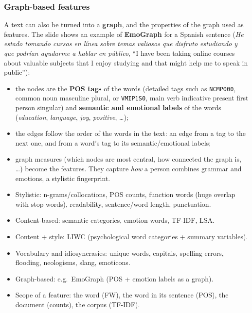 \subsubsection{Graph-based features}

A text can also be turned into a \textbf{graph}, and the properties of the graph used as
features. The slide shows an example of \textbf{EmoGraph} for a Spanish sentence
(\emph{He estado tomando cursos en línea sobre temas valiosos que disfruto estudiando y
que podrían ayudarme a hablar en público}, ``I have been taking online courses about
valuable subjects that I enjoy studying and that might help me to speak in public''):
\begin{itemize}[nosep]
  \item the nodes are the \textbf{POS tags} of the words (detailed tags such as
        \texttt{NCMP000}, common noun masculine plural, or \texttt{VMIP1S0}, main verb
        indicative present first person singular) and \textbf{semantic and emotional
        labels} of the words (\emph{education}, \emph{language}, \emph{joy},
        \emph{positive}, \ldots);
  \item the edges follow the order of the words in the text: an edge from a tag to the
        next one, and from a word's tag to its semantic/emotional labels;
  \item graph measures (which nodes are most central, how connected the graph is, \ldots)
        become the features. They capture \emph{how} a person combines grammar and
        emotions, a stylistic fingerprint.
\end{itemize}

\begin{nbsummary}
\begin{itemize}[nosep]
  \item Stylistic: n-grams/collocations, POS counts, function words (huge overlap with
        stop words), readability, sentence/word length, punctuation.
  \item Content-based: semantic categories, emotion words, TF-IDF, LSA.
  \item Content + style: LIWC (psychological word categories + summary variables).
  \item Vocabulary and idiosyncrasies: unique words, capitals, spelling errors,
        flooding, neologisms, slang, emoticons.
  \item Graph-based: e.g.\ EmoGraph (POS + emotion labels as a graph).
  \item Scope of a feature: the word (FW), the word in its sentence (POS), the document
        (counts), the corpus (TF-IDF).
\end{itemize}
\end{nbsummary}
